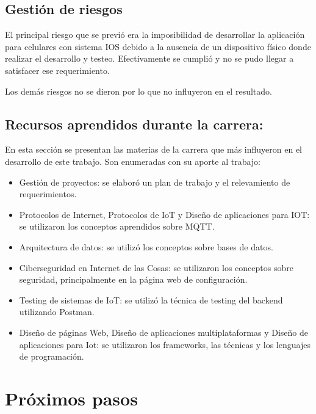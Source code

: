 \subsection{Gestión de riesgos}

El principal riesgo que se previó era la imposibilidad de desarrollar la aplicación para celulares con sistema IOS debido a la ausencia de un dispositivo físico donde realizar el desarrollo y testeo. Efectivamente se cumplió y no se pudo llegar a satisfacer ese requerimiento.

Los demás riesgos no se dieron por lo que no influyeron en el resultado.

\subsection{Recursos aprendidos durante la carrera:}

En esta sección se presentan las materias de la carrera que más influyeron en el desarrollo de este trabajo. Son enumeradas con su aporte al trabajo:

\begin{itemize}
\item Gestión de proyectos: se elaboró un plan de trabajo y el relevamiento de requerimientos.
\item Protocolos de Internet, Protocolos de IoT y Diseño de aplicaciones para IOT: se utilizaron los conceptos aprendidos sobre MQTT.
\item Arquitectura de datos: se utilizó los conceptos sobre bases de datos.
\item Ciberseguridad en Internet de las Cosas: se utilizaron los conceptos sobre seguridad, principalmente en la página web de configuración.
\item Testing de sistemas de IoT: se utilizó la técnica de testing del backend utilizando Postman.
\item Diseño de páginas Web, Diseño de aplicaciones multiplataformas y Diseño de aplicaciones para Iot: se utilizaron los frameworks, las técnicas y los lenguajes de programación.
\end{itemize}

\section{Próximos pasos}

